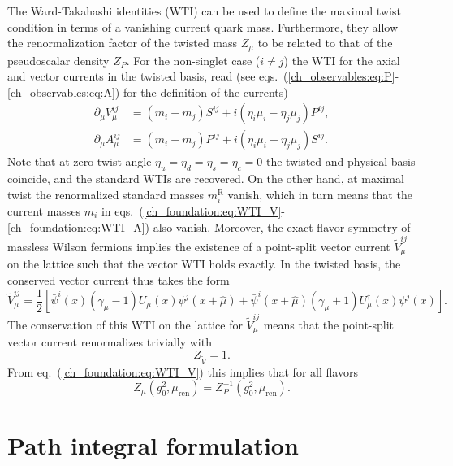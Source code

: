 The Ward-Takahashi identities (WTI) can be used to define the maximal twist condition in terms of a vanishing current quark mass. Furthermore, they allow the renormalization factor of the twisted mass $Z_{\mu}$ to be related to that of the pseudoscalar density $Z_P$. For the non-singlet case ($i\neq j$) the WTI for the axial and vector currents in the twisted basis, read (see eqs.~(\ref{ch_observables:eq:P}-\ref{ch_observables:eq:A}) for the definition of the currents)
\begin{align}
\label{ch_foundation:eq:WTI_V}
\partial_{\mu}V_{\mu}^{ij}&=(m_i-m_j)S^{ij}+i(\eta_i\mu_i-\eta_j\mu_j)P^{ij},\\
\label{ch_foundation:eq:WTI_A}
\partial_{\mu}A_{\mu}^{ij}&=(m_i+m_j)P^{ij}+i(\eta_i\mu_i+\eta_j\mu_j)S^{ij}.
\end{align}
Note that at zero twist angle $\eta_u=\eta_d=\eta_s=\eta_c=0$ the twisted and physical basis coincide, and the standard WTIs are recovered. On the other hand, at maximal twist the renormalized standard masses $m_i^{\textrm{R}}$ vanish, which in turn means that the current masses $m_{i}$ in eqs.~(\ref{ch_foundation:eq:WTI_V}-\ref{ch_foundation:eq:WTI_A}) also vanish. Moreover, the exact flavor symmetry of massless Wilson fermions implies the existence of a point-split vector current $\tilde{V}_{\mu}^{ij}$ on the lattice such that the vector WTI holds exactly. In the twisted basis, the conserved vector current thus takes the form
\begin{equation}
\label{ch_foundation:eq:V_split}
\tilde{V}_{\mu}^{ij}=\frac{1}{2}\left[\bar{\psi}^i(x)(\gamma_{\mu}-1)U_{\mu}(x)\psi^j(x+\hat{\mu})+\bar{\psi}^i(x+\hat{\mu})(\gamma_{\mu}+1)U_{\mu}^{\dagger}(x)\psi^j(x)\right].
\end{equation}
The conservation of this WTI on the lattice for $\tilde{V}_{\mu}^{ij}$ means that the point-split vector current renormalizes trivially with
\begin{equation}
\label{ch_foundation:eq:ZV=1}
Z_{\tilde{V}}=1.
\end{equation}
From eq.~(\ref{ch_foundation:eq:WTI_V}) this implies that for all flavors
\begin{equation}
\label{ch_foundation:eq:Zmu}
Z_{\mu}(g_0^2,\mu_{\textrm{ren}})=Z_P^{-1}(g_0^2,\mu_{\textrm{ren}}).
\end{equation}



\section{Path integral formulation}
\label{ch_foundation:sec:path}

